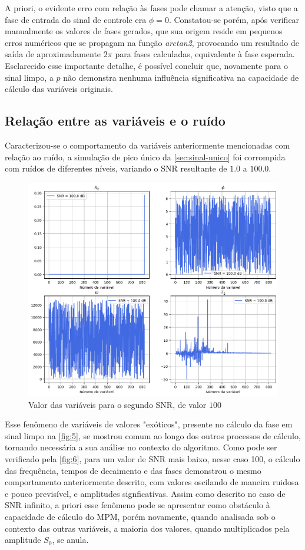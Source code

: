 \documentclass[12pt]{article}
\begin{document}
A priori, o evidente erro com relação às fases pode chamar a atenção, visto que a fase de entrada do sinal de controle era $\phi = 0$.
Constatou-se porém, após verificar manualmente os valores de fases gerados, que sua origem reside em pequenos erros numéricos que se propagam na função 
\textit{arctan2}, provocando um resultado de saída de aproximadamente $2\pi$ para fases calculadas, equivalente à fase esperada. Esclarecido esse 
importante detalhe, é possível concluir que, novamente para o sinal limpo, a $p$ não demonstra nenhuma influência significativa na capacidade de cálculo das 
variáveis originais.

\subsection{Relação entre as variáveis e o ruído}

Caracterizou-se o comportamento da variáveis anteriormente mencionadas com relação ao ruído, a simulação de pico único da \autoref{sec:sinal-unico} foi corrompida com
ruídos de diferentes níveis, variando o SNR resultante de $1.0$ a $100.0$. 

\begin{figure} [H]
    \centering
    \includegraphics[scale=0.625]{var-1.png}
    \caption{Valor das variáveis para o segundo SNR, de valor $100$}
    \label{fig:6}
\end{figure}

Esse fenômeno de variáveis de valores "exóticos", presente no cálculo da fase em sinal limpo na \autoref{fig:5}, se mostrou comum ao longo dos outros processos de 
cálculo, tornando necessária a sua análise no contexto do algoritmo. Como pode ser verificado pela \autoref{fig:6}, para um valor de SNR mais baixo, nesse caso 100, 
o cálculo das frequência, tempos de decaimento e das fases demonstrou o mesmo comportamento anteriormente descrito, com valores oscilando de maneira ruidosa e pouco 
previsível, e amplitudes signficativas. Assim como descrito no caso de SNR infinito, a priori esse fenômeno pode se apresentar como obstáculo à capacidade de cálculo 
do MPM, porém novamente, quando analisada sob o contexto das outras variáveis, a maioria dos valores, quando multiplicados pela amplitude $S_0$, se anula.
\end{document}
